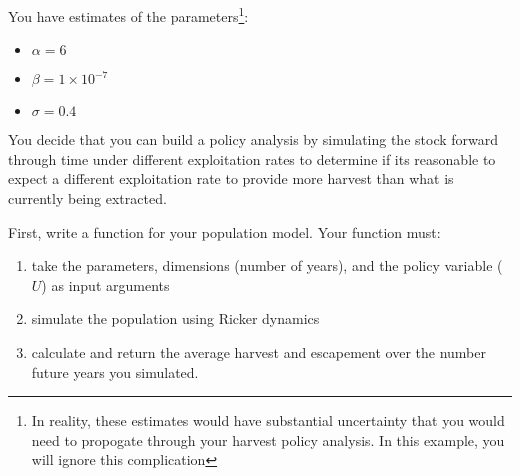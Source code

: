 \documentclass[]{book}
\providecommand{\tightlist}{%
  \setlength{\itemsep}{0pt}\setlength{\parskip}{0pt}}
\let\rmarkdownfootnote\footnote%
\def\footnote{\protect\rmarkdownfootnote}
\theoremstyle{definition}
\theoremstyle{definition}
\theoremstyle{definition}
\theoremstyle{remark}
\begin{document}
You have estimates of the parameters\footnote{In reality, these
  estimates would have substantial uncertainty that you would need to
  propogate through your harvest policy analysis. In this example, you
  will ignore this complication}:

\begin{itemize}
\tightlist
\item
  \(\alpha = 6\)
\item
  \(\beta = 1 \times 10^{-7}\)
\item
  \(\sigma = 0.4\)
\end{itemize}

You decide that you can build a policy analysis by simulating the stock
forward through time under different exploitation rates to determine if
its reasonable to expect a different exploitation rate to provide more
harvest than what is currently being extracted.

First, write a function for your population model. Your function must:

\begin{enumerate}
\def\labelenumi{\arabic{enumi}.}
\tightlist
\item
  take the parameters, dimensions (number of years), and the policy
  variable (\(U\)) as input arguments
\item
  simulate the population using Ricker dynamics
\item
  calculate and return the average harvest and escapement over the
  number future years you simulated.
\end{enumerate}
\end{document}

